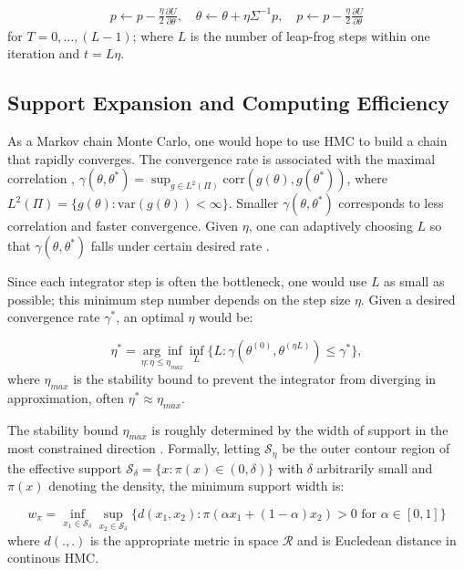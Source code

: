 \documentclass[10pt]{article}
\newcommand{\mc}[1]{\mathcal{#1}}
\DeclareMathOperator{\1}{\mathbbm{1}}
\begin{document}
\begin{equation}
\begin{aligned}
\label{leap-frog}
p \leftarrow p - \frac{\eta}{2} \frac{\partial U}{\partial  \theta },\quad
 \theta \leftarrow  \theta  + \eta \Sigma^{-1}p,\quad
p \leftarrow p -  \frac{\eta}{2}  \frac{\partial U}{\partial  \theta } 
\end{aligned}
\end{equation}
for $T=0,\ldots,(L-1)$; where $L$ is the number of leap-frog steps within one iteration and $t=L\eta$.


\subsection{Support Expansion and Computing Efficiency}

As a Markov chain Monte Carlo, one would hope to use HMC to build a chain that rapidly converges. The convergence rate is associated with the maximal correlation  \citep{liu2008monte}, $\gamma (\theta,\theta^*) = \sup_{g \in L^2(\Pi)} \mbox{corr}(g(\theta), g(\theta^*))
$, where $L^2(\Pi)=\{g(\theta): \mbox{var}(g(\theta))<\infty\}$. Smaller $\gamma (\theta,\theta^*)$ corresponds to less correlation and faster convergence. Given $\eta$, one can adaptively choosing $L$ so that $\gamma (\theta,\theta^*)$ falls under certain desired rate \citep{hoffman2014no}.

Since each integrator step is often the bottleneck, one would use $L$ as small as possible; this minimum step number depends on the step size $\eta$. Given a desired convergence rate $\gamma^*$, an optimal $\eta$ would be:

$$\eta^* =  \underset{\eta: \eta \le \eta_{max}}{\arg\inf}\inf_{L}\{L: \gamma \left(\theta^{(0)}, \theta^{(\eta L)} \right) \le \gamma^*   \},$$
where $\eta_{max}$ is the stability bound to prevent the integrator from diverging in approximation, often $\eta^*\approx \eta_{max}$.

The stability bound $\eta_{max}$ is roughly determined by the width of support in the most constrained direction  \citep{neal2011mcmc}. Formally, letting $\mc S_{\eta}$ be the outer contour region of the effective support $\mc S_{\delta}=\{x: \pi(x)\in (0,\delta)\}$ with $\delta$ arbitrarily small and $\pi(x)$ denoting the density, the minimum support width is:

$$w_\pi = \underset{{x_1\in \mc S_\delta}}{\inf}\underset{x_2\in \mc S_\delta}{\sup} \{ d(x_1, x_2): \pi(\alpha x_1 + (1-\alpha)x_2)>0 \text{ for } \alpha \in [0,1]  \}$$
where $d(.,.)$ is the appropriate metric in space $\mc R$ and is Eucledean distance in continous HMC.
\end{document}
